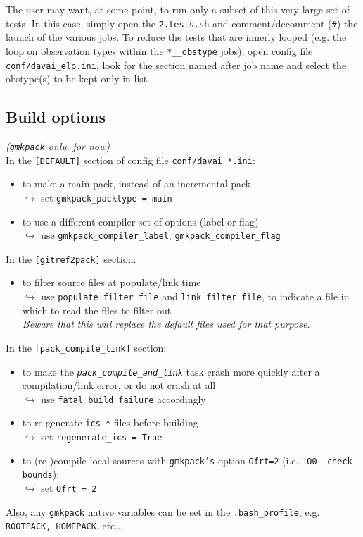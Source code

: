 \documentclass[a4paper,10pt,twoside]{article}
\begin{document}
The user may want, at some point, to run only a subset of this very large set of tests. In this case, simply open the \texttt{2.tests.sh} and comment/decomment (\texttt{\#}) the launch of the various jobs.
To reduce the tests that are innerly looped (e.g. the loop on observation types within the \texttt{*\_\_obstype} jobs), open config file \texttt{conf/davai\_elp.ini}, look for the section named after job name and select the obstype(s) to be kept only in list.


\subsection{Build options}
\textit{(\texttt{gmkpack} only, for now)}\\
In the \texttt{[DEFAULT]} section of config file \texttt{conf/davai\_*.ini}:
\begin{itemize}
 \item to make a main pack, instead of an incremental pack\\
 $\hookrightarrow$ set \texttt{gmkpack\_packtype = main}
 \item to use a different compiler set of options (label or flag)\\
 $\hookrightarrow$ use \texttt{gmkpack\_compiler\_label}, \texttt{gmkpack\_compiler\_flag}
\end{itemize}
In the \texttt{[gitref2pack]} section:
\begin{itemize}
 \item to filter source files at populate/link time\\
 $\hookrightarrow$ use \texttt{populate\_filter\_file} and \texttt{link\_filter\_file}, to indicate a file in which to read the files to filter out.\\
 \textit{Beware that this will replace the default files used for that purpose.}
\end{itemize}
In the \texttt{[pack\_compile\_link]} section:
\begin{itemize}
 \item to make the \texttt{\textit{pack\_compile\_and\_link}} task crash more quickly after a compilation/link error, or do not crash at all\\
 $\hookrightarrow$ use \texttt{fatal\_build\_failure} accordingly
 \item to re-generate \texttt{ics\_*} files before building\\
 $\hookrightarrow$ set \texttt{regenerate\_ics = True}
 \item to (re-)compile local sources with \texttt{gmkpack's} option \texttt{Ofrt=2} (i.e. \texttt{-O0 -check bounds}):\\
 $\hookrightarrow$ set \texttt{Ofrt = 2}
\end{itemize}
\noindent Also, any \texttt{gmkpack} native variables can be set in the \texttt{.bash\_profile}, e.g. \texttt{ROOTPACK, HOMEPACK}, etc...
\end{document}

